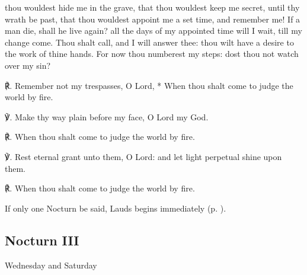  thou wouldest hide me in the grave, that thou wouldest keep me secret, until thy wrath be past, that thou wouldest appoint me a set time, and remember me! If a man die, shall he live again? all the days of my appointed time will I wait, till my change come. Thou shalt call, and I will answer thee: thou wilt have a desire to the work of thine hands. For now thou numberest my steps: dost thou not watch over my sin?\par
℟. Remember not {\dag} my trespasses, O Lord, * When thou shalt come to judge the world by fire.\par
℣. Make thy way plain before my face, O Lord my God.\par
℟. When thou shalt come to judge the world by fire.\par
℣. Rest eternal grant unto them, O Lord: and let light perpetual shine upon them.\par
℟. When thou shalt come to judge the world by fire.
\begin{rubric}
    {If only one Nocturn be said, Lauds begins immediately (p. \pageref{laudsdead}).}
\end{rubric}

\subsection{Nocturn III}
\begin{inhead}
Wednesday and Saturday
\end{inhead}

\vspace{-0.5\baselineskip}

